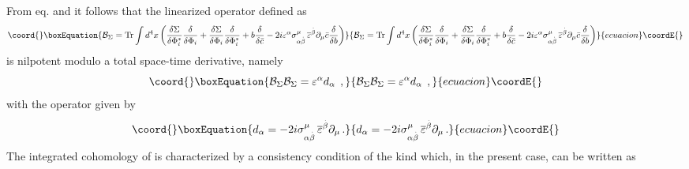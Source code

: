 \documentclass[a4paper,12pt]{article}
\begin{document}
From eq.\myHighlight{$\left( \ref{n1slav}\right) $}\coordHE{} and \myHighlight{$\left( \ref{n1slav2}\right) $}\coordHE{} it
follows that the linearized operator \coordHE{} defined as 
\begin{equation}\coord{}\boxEquation{
\mathcal{B}_{\Sigma }=\mathrm{Tr}\int d^{4}x\left( \frac{\delta \Sigma }{
\delta \Phi _{i}^{*}}\frac{\delta }{\delta \Phi _{i}}+\frac{\delta \Sigma }{
\delta \Phi _{i}}\frac{\delta }{\delta \Phi _{i}^{*}}+b\frac{\delta }{\delta 
\bar{c}}-2i\varepsilon ^{\alpha }\sigma _{\alpha \stackrel{.}{\beta }}^{\mu
}\,\overline{\varepsilon }^{\stackrel{.}{\beta }}\partial _{\mu }\bar{c}
\frac{\delta }{\delta b}\right) 
}{
\mathcal{B}_{\Sigma }=\mathrm{Tr}\int d^{4}x\left( \frac{\delta \Sigma }{
\delta \Phi _{i}^{*}}\frac{\delta }{\delta \Phi _{i}}+\frac{\delta \Sigma }{
\delta \Phi _{i}}\frac{\delta }{\delta \Phi _{i}^{*}}+b\frac{\delta }{\delta 
\bar{c}}-2i\varepsilon ^{\alpha }\sigma _{\alpha \stackrel{.}{\beta }}^{\mu
}\,\overline{\varepsilon }^{\stackrel{.}{\beta }}\partial _{\mu }\bar{c}
\frac{\delta }{\delta b}\right) 
}{ecuacion}\coordE{}\end{equation}
is nilpotent modulo a total space-time derivative, namely 
\begin{equation}\coord{}\boxEquation{
\mathcal{B}_{\Sigma }\mathcal{B}_{\Sigma }=\varepsilon ^{\alpha }d_{\alpha
}\;\,,  \label{niln1}
}{
\mathcal{B}_{\Sigma }\mathcal{B}_{\Sigma }=\varepsilon ^{\alpha }d_{\alpha
}\;\,,  }{ecuacion}\coordE{}\end{equation}
with the operator \coordHE{} given by 
\begin{equation}\coord{}\boxEquation{
d_{\alpha }=-2i\sigma _{\alpha \stackrel{.}{\beta }}^{\mu }\,\overline{
\varepsilon }^{\stackrel{.}{\beta }}\partial _{\mu }\,.  \label{dan1}
}{
d_{\alpha }=-2i\sigma _{\alpha \stackrel{.}{\beta }}^{\mu }\,\overline{
\varepsilon }^{\stackrel{.}{\beta }}\partial _{\mu }\,.  }{ecuacion}\coordE{}\end{equation}
The integrated cohomology of \coordHE{} is characterized by a
consistency condition of the kind \myHighlight{$\left( \ref{w-z}\right) $}\coordHE{} which, in the
present case, can be written as \cite{ul} 
\end{document}
